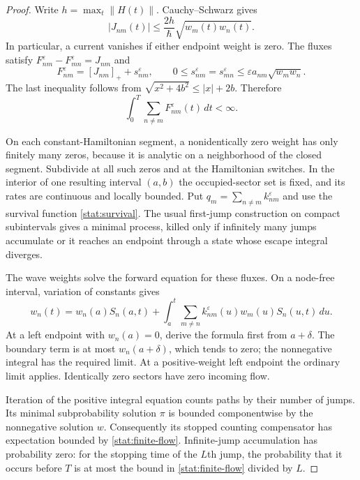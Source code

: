 \documentclass[11pt,oneside,openany]{book}
\theoremstyle{definition}
\theoremstyle{remark}\newtheorem{remark}[theorem]{Remark}
\begin{document}
\begin{proof}
Write $h=\max_t\|H(t)\|$. Cauchy--Schwarz gives
\begin{equation}\label{stat:current-bound}
 |J_{nm}(t)|\leq\frac{2h}{\hbar}\sqrt{w_m(t)w_n(t)}.
\end{equation}
In particular, a current vanishes if either endpoint weight is zero.
The fluxes satisfy $F^\varepsilon_{nm}-F^\varepsilon_{mn}=J_{nm}$ and
\begin{equation}\label{stat:excess-bound}
 F^\varepsilon_{nm}=[J_{nm}]_++s^\varepsilon_{nm},\qquad
 0\leq s^\varepsilon_{nm}=s^\varepsilon_{mn}
       \leq\varepsilon a_{nm}\sqrt{w_mw_n}.
\end{equation}
The last inequality follows from
$\sqrt{x^2+4b^2}\leq|x|+2b$. Therefore
\begin{equation}\label{stat:finite-flow}
 \int_0^T\sum_{n\ne m}F^\varepsilon_{nm}(t)\,dt<\infty.
\end{equation}

On each constant-Hamiltonian segment, a nonidentically zero weight has only
finitely many zeros, because it is analytic on a neighborhood of the closed
segment. Subdivide at all such zeros and at the Hamiltonian switches. In the
interior of one resulting interval $(a,b)$ the occupied-sector set is fixed,
and its rates are continuous and locally bounded. Put
$q_m=\sum_{n\ne m}k^\varepsilon_{nm}$ and use the survival function
\eqref{stat:survival}. The usual first-jump construction on compact
subintervals gives a minimal process, killed only if infinitely many jumps
accumulate or it reaches an endpoint through a state whose escape integral
diverges.

The wave weights solve the forward equation for these fluxes. On a
node-free interval, variation of constants gives
\begin{equation}\label{stat:duhamel}
 w_n(t)=w_n(a)S_n(a,t)+
   \int_a^t \sum_{m\ne n}k^\varepsilon_{nm}(u)w_m(u)S_n(u,t)\,du.
\end{equation}
At a left endpoint with $w_n(a)=0$, derive the formula first from
$a+\delta$. The boundary term is at most $w_n(a+\delta)$, which tends to zero;
the nonnegative integral has the required limit. At a positive-weight left
endpoint the ordinary limit applies. Identically zero sectors have zero
incoming flow.

Iteration of the positive integral equation counts paths by their number
of jumps. Its minimal subprobability solution $\pi$ is bounded componentwise
by the nonnegative solution $w$. Consequently its stopped counting
compensator has expectation bounded by
\eqref{stat:finite-flow}. Infinite-jump accumulation has probability zero:
for the stopping time of the $L$th jump, the probability that it occurs
before $T$ is at most the bound in \eqref{stat:finite-flow} divided by $L$.


\end{proof}
\end{document}
